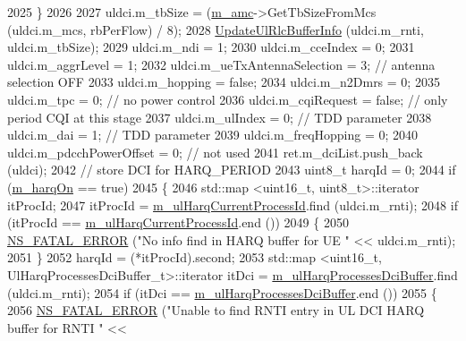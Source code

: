 \begin{DoxyCode}
2025         \}
2026 
2027       uldci.m\_tbSize = (\hyperlink{classns3_1_1FdTbfqFfMacScheduler_a53e0bcb714cd32ee639f7b4e7265087c}{m\_amc}->GetTbSizeFromMcs (uldci.m\_mcs, rbPerFlow) / 8);
2028       \hyperlink{classns3_1_1FdTbfqFfMacScheduler_aecdd6c2d6176edebe823a9cb22dfb317}{UpdateUlRlcBufferInfo} (uldci.m\_rnti, uldci.m\_tbSize);
2029       uldci.m\_ndi = 1;
2030       uldci.m\_cceIndex = 0;
2031       uldci.m\_aggrLevel = 1;
2032       uldci.m\_ueTxAntennaSelection = 3; \textcolor{comment}{// antenna selection OFF}
2033       uldci.m\_hopping = \textcolor{keyword}{false};
2034       uldci.m\_n2Dmrs = 0;
2035       uldci.m\_tpc = 0; \textcolor{comment}{// no power control}
2036       uldci.m\_cqiRequest = \textcolor{keyword}{false}; \textcolor{comment}{// only period CQI at this stage}
2037       uldci.m\_ulIndex = 0; \textcolor{comment}{// TDD parameter}
2038       uldci.m\_dai = 1; \textcolor{comment}{// TDD parameter}
2039       uldci.m\_freqHopping = 0;
2040       uldci.m\_pdcchPowerOffset = 0; \textcolor{comment}{// not used}
2041       ret.m\_dciList.push\_back (uldci);
2042       \textcolor{comment}{// store DCI for HARQ\_PERIOD}
2043       uint8\_t harqId = 0;
2044       \textcolor{keywordflow}{if} (\hyperlink{classns3_1_1FdTbfqFfMacScheduler_afb4bf57d3b17b967f82a5b2134cd70e7}{m\_harqOn} == \textcolor{keyword}{true})
2045         \{
2046           std::map <uint16\_t, uint8\_t>::iterator itProcId;
2047           itProcId = \hyperlink{classns3_1_1FdTbfqFfMacScheduler_a36b22976070611aa3fdd5c573f891dc2}{m\_ulHarqCurrentProcessId}.find (uldci.m\_rnti);
2048           \textcolor{keywordflow}{if} (itProcId == \hyperlink{classns3_1_1FdTbfqFfMacScheduler_a36b22976070611aa3fdd5c573f891dc2}{m\_ulHarqCurrentProcessId}.end ())
2049             \{
2050               \hyperlink{group__fatal_ga5131d5e3f75d7d4cbfd706ac456fdc85}{NS\_FATAL\_ERROR} (\textcolor{stringliteral}{"No info find in HARQ buffer for UE "} << uldci.m\_rnti);
2051             \}
2052           harqId = (*itProcId).second;
2053           std::map <uint16\_t, UlHarqProcessesDciBuffer\_t>::iterator itDci = 
      \hyperlink{classns3_1_1FdTbfqFfMacScheduler_a8566c4093902c1a4c227fa795fa90756}{m\_ulHarqProcessesDciBuffer}.find (uldci.m\_rnti);
2054           \textcolor{keywordflow}{if} (itDci == \hyperlink{classns3_1_1FdTbfqFfMacScheduler_a8566c4093902c1a4c227fa795fa90756}{m\_ulHarqProcessesDciBuffer}.end ())
2055             \{
2056               \hyperlink{group__fatal_ga5131d5e3f75d7d4cbfd706ac456fdc85}{NS\_FATAL\_ERROR} (\textcolor{stringliteral}{"Unable to find RNTI entry in UL DCI HARQ buffer for RNTI "} << 

\end{DoxyCode}
